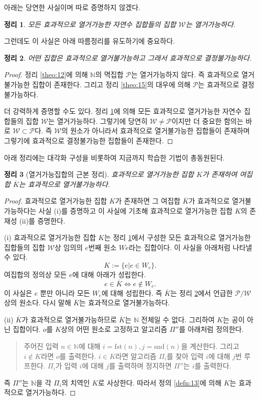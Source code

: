 \documentclass[a4paper,chapter,atbegshi]{oblivoir}
\newtheorem{theo}{정리}[chapter]
\begin{document}
아래는 당연한 사실이며 따로 증명하지 않겠다.
\begin{theo}\label{theo:18}
  모든 효과적으로 열거가능한 자연수 집합들의 집합 $\mathcal{W}$는 열거가능하다.
\end{theo}
그런데도 이 사실은 아래 따름정리를 유도하기에 중요하다.
\begin{theo}\label{theo:19}
  어떤 집합은 효과적으로 열거불가능하고 그래서 효과적으로 결정불가능하다.
\end{theo}
\begin{proof}
  정리 \ref{theo:12}에 의해 $\mathbb{N}$의 멱집합 $\mathcal{P}$는 열거가능하지
  않다. 즉 효과적으로 열거불가능한 집합이 존재한다. 그리고 정리 \ref{theo:15}의
  대우에 의해 $\mathcal{P}$는 효과적으로 결정불가능하다. 

  더 강력하게 증명할 수도 있다. 정리 \ref{theo:18}에 의해 모든 효과적으로
  열거가능한 자연수 집합들의 집합 $\mathcal{W}$는 열거가능하다. 그렇기에
  당연히 $\mathcal{W}\neq\mathcal{P}$이지만 더 중요한 함의는 바로 $\mathcal{W}
  \subset\mathcal{P}$다. 즉 $\mathcal{W}$의 원소가 아니라서 효과적으로 
  열거불가능한 집합들이 존재하며 그렇기에 효과적으로 결정불가능한 집합들이
  존재한다.
\end{proof}
아래 정리에는 대각화 구성을 비롯하여 지금까지 학습한 기법이 총동원된다. 
\begin{theo}[열거가능집합의 근본 정리]
  효과적으로 열거가능한 집합 $K$가 존재하여 여집합 $\overline{K}$는
  효과적으로 열거불가능하다.
\end{theo}
\begin{proof}
    효과적으로 열거가능한 집합 $K$가 존재하면 그 여집합 $\overline{K}$가
    효과적으로 열거불가능하다는 사실 (i)를 증명하고 이 사실에 기초해 효과적으로
    열거가능한 집합 $K$의 존재성 (ii)를 증명한다.

  (i) 
  효과적으로 열거가능한 집합 $K$는 정리 \ref{theo:18}에서 구성한 모든 효과적으로
  열거가능한 집합들의 집합 $\mathcal{W}$상 임의의 $e$번째 원소 $We$라는 집합이다.
  이 사실을 아래처럼 나타낼 수 있다. 
  \[
    K:=\{e|e\in W_e\}.
  \]
  여집합의 정의상 모든 $e$에 대해 아래가 성립한다.
  \[
    e\in\overline{K}\iff e\notin W_e.
  \]
  이 사실은 $e$ 뿐만 아니라 모든 $W_e$에 대해 성립한다. 즉 $\overline{K}$는
  정리 \ref{theo:19}에서 언급한 $\mathcal{P}/\mathcal{W}$상의 원소다. 
  다시 말해 $\overline{K}$는 효과적으로 열거불가능하다.

  (ii)
  $\overline{K}$가 효과적으로 열거불가능하므로 $\overline{K}$는 $\mathbb{N}$
  전체일 수 없다. 그리하여 $K$는 공이 아닌 집합이다. $o$를 $K$상의 어떤
  원소로 고정하고 알고리즘 $\Pi''$를 아래처럼 정의한다.
  \begin{quote}
    주어진 입력 $n\in\mathbb{N}$에 대해 $i=\textrm{fst}(n),j=\textrm{snd}(n)$을
    계산한다. 그리고 $i\notin K$라면 $o$를 출력한다. 
    $i\in K$라면 알고리즘 $\Pi_i$를 찾아 입력 $i$에 대해 $j$번 루프한다.
    $\Pi_i$가 입력 $i$에 대해 $j$를 출력하며 정지하면
    $\Pi''$는 $i$를 출력한다.
  \end{quote}
  즉 $\Pi''$는 $\mathbb{N}$을 각 $\Pi_i$의 치역인 $K$로 사상한다. 
  따라서 정의 \ref{defn:13}에 의해 $K$는 효과적으로 열거가능하다.
\end{proof}
\end{document}
